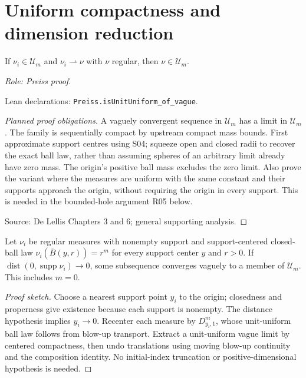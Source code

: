 \section{Uniform compactness and dimension reduction}

\begin{lemma}
\label{lem:uniform-vague-closed}






If $\nu_i\in\mathcal U_m$ and $\nu_i\rightharpoonup\nu$ with $\nu$ regular, then $\nu\in\mathcal U_m$.
\par\emph{Role: Preiss proof.}
\par Lean declarations: \texttt{Preiss.isUnitUniform\_of\_vague}.
\end{lemma}
\begin{proof}[Planned proof obligations]

A vaguely convergent sequence in $\mathcal U_m$ has a limit in $\mathcal U_m$.
The family is sequentially compact by upstream compact mass bounds.
First approximate support centres using S04; squeeze open and closed radii to
recover the exact ball law, rather than assuming spheres of an arbitrary limit
already have zero mass. The origin's positive ball mass excludes the zero limit.
Also prove the variant where the measures are uniform with the same constant
and their supports approach the origin, without requiring the origin in every
support. This is needed in the bounded-hole argument R05 below.
\par Source: De Lellis Chapters 3 and 6; general supporting analysis.
\end{proof}

\begin{lemma}
\label{lem:uniform-near-support-compactness}
Let $\nu_i$ be regular measures with nonempty support and support-centered closed-ball law $\nu_i(\overline B(y,r))=r^m$ for every support center $y$ and $r>0$. If $\operatorname{dist}(0,\operatorname{supp}\nu_i)\to0$, some subsequence converges vaguely to a member of $\mathcal U_m$. This includes $m=0$.
\end{lemma}
\begin{proof}[Proof sketch]
Choose a nearest support point $y_i$ to the origin; closedness and properness give existence because each support is nonempty. The distance hypothesis implies $y_i\to0$. Recenter each measure by $D^m_{y_i,1}$, whose unit-uniform ball law follows from blow-up transport. Extract a unit-uniform vague limit by centered compactness, then undo translations using moving blow-up continuity and the composition identity. No initial-index truncation or positive-dimensional hypothesis is needed.
\end{proof}

